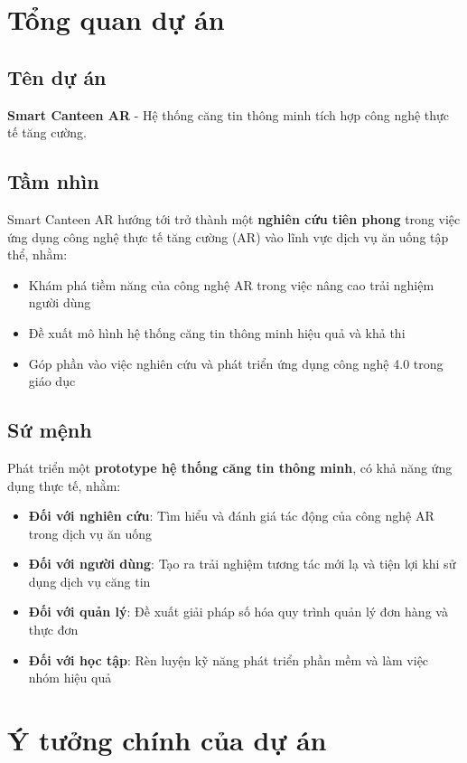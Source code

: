 \documentclass[12pt,a4paper]{article}
\begin{document}
\newpage

\section{Tổng quan dự án}

\subsection{Tên dự án}
\textbf{Smart Canteen AR} - Hệ thống căng tin thông minh tích hợp công nghệ thực tế tăng cường.
\subsection{Tầm nhìn}
Smart Canteen AR hướng tới trở thành một \textbf{nghiên cứu tiên phong} trong việc ứng dụng công nghệ thực tế tăng cường (AR) vào lĩnh vực dịch vụ ăn uống tập thể, nhằm:

\begin{itemize}[leftmargin=1cm]
    \item Khám phá tiềm năng của công nghệ AR trong việc nâng cao trải nghiệm người dùng
    \item Đề xuất mô hình hệ thống căng tin thông minh hiệu quả và khả thi
    \item Góp phần vào việc nghiên cứu và phát triển ứng dụng công nghệ 4.0 trong giáo dục
\end{itemize}

\subsection{Sứ mệnh}
Phát triển một \textbf{prototype hệ thống căng tin thông minh}, có khả năng ứng dụng thực tế, nhằm:

\begin{itemize}[leftmargin=1cm]
    \item \textbf{Đối với nghiên cứu}: Tìm hiểu và đánh giá tác động của công nghệ AR trong dịch vụ ăn uống
    \item \textbf{Đối với người dùng}: Tạo ra trải nghiệm tương tác mới lạ và tiện lợi khi sử dụng dịch vụ căng tin
    \item \textbf{Đối với quản lý}: Đề xuất giải pháp số hóa quy trình quản lý đơn hàng và thực đơn
    \item \textbf{Đối với học tập}: Rèn luyện kỹ năng phát triển phần mềm và làm việc nhóm hiệu quả
\end{itemize}

\section{Ý tưởng chính của dự án}
\end{document}
